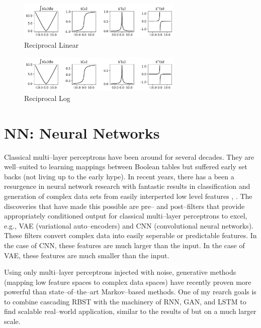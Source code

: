 \documentclass{article}
\begin{document}
    \begin{figure}[h!]
        \centering
        \includegraphics[width=0.7\textwidth]{./figs/nn/sig/inv_lin.png}
        \caption{Reciprocal Linear}
        \label{fig:sig_inv_lin}
    \end{figure}
    \begin{figure}[h!]
        \centering
        \includegraphics[width=0.7\textwidth]{./figs/nn/sig/inv_log.png}
        \caption{Reciprocal Log}
        \label{fig:sig_inv_log}
    \end{figure}

\clearpage

\section{NN: Neural Networks}\label{sec:nn} 

    Classical multi--layer perceptrons have been around for several decades.
    They are well--suited to learning mappings between Boolean tables
    but suffered early set backs (not living up to the early hype).
    In recent years,
    there has a been a resurgence in neural network research with fantastic results
    in classification \cite{yolo} and generation of complex data sets
    from easily interperted low level features
    \cite{img2img}, \cite{stylegan}.  
    The discoveries that have made this possible are pre-- and post--filters
    that provide appropriately conditioned output for classical 
    multi--layer perceptrons to excel, e.g., VAE (variational auto--encoders) and 
    CNN (convolutional neural networks).  
    These filters convert complex data into easily seperable or predictable features.
    In the case of CNN, these features are much larger than the input.
    In the case of VAE, these features are much smaller than the input.

    Using only multi--layer perceptrons injected with noise,
    generative methods (mapping low feature spaces to complex data spaces) have
    recently proven more powerful than state--of--the--art Markov--based methods.
    One of my rearch goals is to combine cascading RBST with
    the machinery of RNN, GAN, and LSTM to find scalable real--world application,
    similar to the results of \cite{world} but on a much larger scale.
\end{document}
